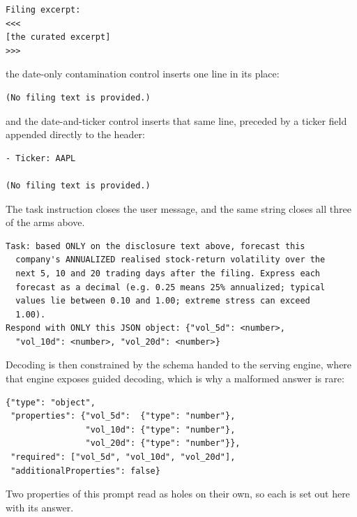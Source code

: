 \begin{verbatim}
Filing excerpt:
<<<
[the curated excerpt]
>>>
\end{verbatim}

the date-only contamination control inserts one line in its place:

\begin{verbatim}
(No filing text is provided.)
\end{verbatim}

and the date-and-ticker control inserts that same line, preceded by a ticker
field appended directly to the header:

\begin{verbatim}
- Ticker: AAPL

(No filing text is provided.)
\end{verbatim}

The task instruction closes the user message, and the same string closes all
three of the arms above.

\begin{verbatim}
Task: based ONLY on the disclosure text above, forecast this
  company's ANNUALIZED realised stock-return volatility over the
  next 5, 10 and 20 trading days after the filing. Express each
  forecast as a decimal (e.g. 0.25 means 25% annualized; typical
  values lie between 0.10 and 1.00; extreme stress can exceed
  1.00).
Respond with ONLY this JSON object: {"vol_5d": <number>,
  "vol_10d": <number>, "vol_20d": <number>}
\end{verbatim}

Decoding is then constrained by the schema handed to the serving engine, where
that engine exposes guided decoding, which is why a malformed answer is rare:

\begin{verbatim}
{"type": "object",
 "properties": {"vol_5d":  {"type": "number"},
                "vol_10d": {"type": "number"},
                "vol_20d": {"type": "number"}},
 "required": ["vol_5d", "vol_10d", "vol_20d"],
 "additionalProperties": false}
\end{verbatim}

Two properties of this prompt read as holes on their own, so each is set out here with its answer.

